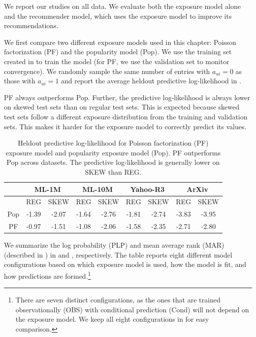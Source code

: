 We report our studies on all data. We evaluate both the exposure
model alone and the recommender model, which uses the exposure model
to improve its recommendations.

 We first compare two
different exposure models used in this chapter: Poisson factorization
(PF) and the popularity model (Pop). We use the training set
created in  to train the model (for PF, we use
the validation set to monitor convergence). We randomly sample the same
number of entries with $a_{ui} = 0$ as those with $a_{ui} = 1$ and
report the average heldout predictive log-likelihood in
.


PF always outperforms Pop. Further, the predictive log-likelihood is
always lower on skewed test sets than on regular test sets. This is
expected because skewed test sets follow a different exposure
distribution from the training and validation sets. This makes it
harder for the exposure model to correctly predict its values.

\begin{table}
\centering
\begin{tabular}{ c  c c  c c  c c  c c  }
  \toprule
  \multicolumn{1}{c}{} & \multicolumn{2}{c}{\textbf{ML-1M}} & \multicolumn{2}{c}{\textbf{ML-10M}} & \multicolumn{2}{c}{\textbf{Yahoo-R3}} & \multicolumn{2}{c}{\textbf{ArXiv}} \\ \midrule
      & REG & SKEW   & REG & SKEW     & REG & SKEW          & REG & SKEW  \\ \midrule
  Pop &  -1.39 &  -2.07  & -1.64 &  -2.76 & -1.81 & -2.74       & -3.83 & -3.95 \\
  PF  &  -0.97 &  -1.51  & -1.08 & -2.06 & -1.58 & -2.35        &
                                                                  -2.71 & -2.80 \\
\bottomrule
\end{tabular}
\caption{Heldout predictive log-likelihood for Poisson factorization (PF) exposure model and popularity exposure model (Pop). PF outperforms Pop across datasets. The predictive log-likelihood is generally lower on SKEW than REG. }
\label{tab:eval_expo}
\end{table}

 We summarize the log
probability (PLP) and mean average rank (MAR) (described in ) in
 and , respectively. The table
reports eight different model configurations based on which
exposure model is used, how the model is fit, and how predictions are
formed.\footnote{There
  are seven distinct
  configurations, as the ones that are trained observationally (OBS)
  with conditional prediction (Cond) will not depend on the exposure
  model. We keep all eight configurations in  for
  easy comparison.} 

